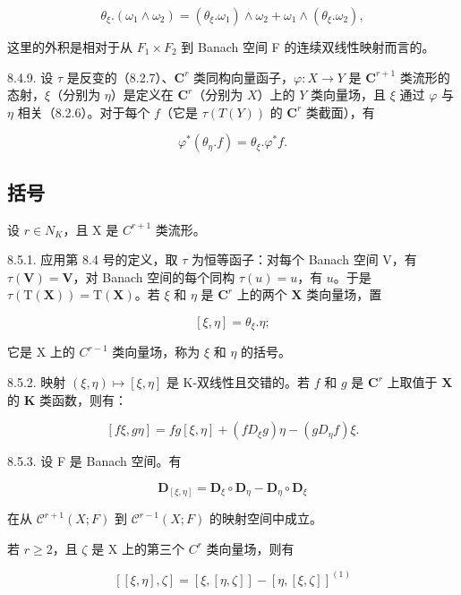 \[
\theta_ {\xi}. (\omega_ {1} \wedge \omega_ {2}) = (\theta_ {\xi}. \omega_ {1}) \wedge \omega_ {2} + \omega_ {1} \wedge (\theta_ {\xi}. \omega_ {2}),\tag{8}
\]

这里的外积是相对于从 \(F_{1} \times F_{2}\) 到 Banach 空间 F 的连续双线性映射而言的。

8.4.9. 设 \(\tau\) 是反变的（8.2.7）、\(\mathbf{C}^r\) 类同构向量函子，\(\varphi: X \to Y\) 是 \(\mathbf{C}^{r+1}\) 类流形的态射，\(\xi\)（分别为 \(\eta\)）是定义在 \(\mathbf{C}^r\)（分别为 \(X\)）上的 \(Y\) 类向量场，且 \(\xi\) 通过 \(\varphi\) 与 \(\eta\) 相关（8.2.6）。对于每个 \(f\)（它是 \(\tau(T(Y))\) 的 \(\mathbf{C}^r\) 类截面），有

\[
\varphi^ {*} (\theta_ {\eta}. f) = \theta_ {\xi}. \varphi^ {*} f.
\]

\subsection{括号}

设 \(r \in N_{K}\)，且 X 是 \(C^{r+1}\) 类流形。

8.5.1. 应用第 8.4 号的定义，取 \(\tau\) 为恒等函子：对每个 Banach 空间 V，有 \(\tau(\mathbf{V}) = \mathbf{V}\)，对 Banach 空间的每个同构 \(\tau(u) = u\)，有 \(u\)。于是 \(\tau(\mathrm{T}(\mathbf{X})) = \mathrm{T}(\mathbf{X})\)。若 \(\xi\) 和 \(\eta\) 是 \(\mathbf{C}^r\) 上的两个 \(\mathbf{X}\) 类向量场，置

\[
[ \xi , \eta ] = \theta_ {\xi}. \eta ;\tag{1}
\]

它是 X 上的 \(C^{r-1}\) 类向量场，称为 \(\xi\) 和 \(\eta\) 的括号。

8.5.2. 映射 \((\xi, \eta) \mapsto [\xi, \eta]\) 是 K-双线性且交错的。若 \(f\) 和 \(g\) 是 \(\mathbf{C}^r\) 上取值于 \(\mathbf{X}\) 的 \(\mathbf{K}\) 类函数，则有：

\[
[ f \xi , g \eta ] = f g [ \xi , \eta ] + (f D _ {\xi} g) \eta - (g D _ {\eta} f) \xi .\tag{2}
\]

8.5.3. 设 F 是 Banach 空间。有

\[
\mathbf {D} _ {[ \xi , \eta ]} = \mathbf {D} _ {\xi} \circ \mathbf {D} _ {\eta} - \mathbf {D} _ {\eta} \circ \mathbf {D} _ {\xi}\tag{3}
\]

在从 \(\mathcal{C}^{r+1}(X;F)\) 到 \(\mathcal{C}^{r-1}(X;F)\) 的映射空间中成立。

若 \(r \geqslant 2\)，且 \(\zeta\) 是 X 上的第三个 \(C^r\) 类向量场，则有

\[
[ [ \xi , \eta ], \zeta ] = [ \xi , [ \eta , \zeta ] ] - [ \eta , [ \xi , \zeta ] ] ^ {(1)}\tag{4}
\]

